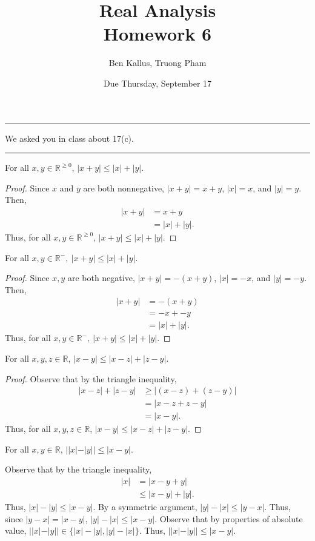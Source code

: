 \documentclass[12pt]{article}
\title{Real Analysis \\ Homework 6}
\author{Ben Kallus, Truong Pham}
\date{Due Thursday, September 17}
\begin{document}
\maketitle

\hrule
\bigskip

 We asked you in class about 17(c). 

\bigskip
\hrule
\bigskip


 For all $x,y \in \mathbb R^{\geq0}$, $|x+y|\leq|x|+|y|$.
\begin{proof}
    Since $x$ and $y$ are both nonnegative, $|x+y| = x+y$, $|x| = x$, and $|y| = y$. Then,
    \begin{align*}
        |x+y| &= x + y \\
              &= |x| + |y|.
    \end{align*}
    Thus, for all $x, y \in \mathbb R^{\geq0}$, $|x+y| \leq |x| + |y|$.
\end{proof}

 For all $x,y \in \mathbb R^-,~|x+y|\leq|x|+|y|$.
\begin{proof}
    Since $x, y$ are both negative, $|x+y| = -(x + y)$, $|x| = -x$, and $|y| = -y$. Then,
    \begin{align*}
        |x+y| &= -(x + y) \\
              &= -x + -y \\
              &= |x| + |y|.
    \end{align*}
    Thus, for all $x,y \in \mathbb R^-,~|x+y|\leq|x|+|y|$.
\end{proof}

\newpage
{} For all $x,y,z \in \mathbb R$, $|x-y| \leq |x - z| + |z - y|$.
\begin{proof}
Observe that by the triangle inequality, \begin{align*}
    |x - z| + |z - y| &\geq |(x-z) + (z-y)| \\
                      &=    |x - z + z - y| \\
                      &=    |x - y|.
\end{align*}
Thus, for all $x,y,z \in \mathbb R$, $|x-y| \leq |x - z| + |z - y|$.
\end{proof}
    
\newpage
{} For all $x,y \in \mathbb R$, $||x|-|y|| \leq |x-y|$.

    Observe that by the triangle inequality, \begin{align*}
        |x| &= |x - y + y| \\
            &\leq |x - y| + |y|.
    \end{align*}
    Thus, $|x| - |y| \leq |x - y|$. By a symmetric argument, $|y| - |x| \leq |y - x|$. Thus, since $|y - x| = |x - y|$, $|y| - |x| \leq |x - y|$. Observe that by properties of absolute value, $||x| - |y|| \in \{|x| - |y|, |y| - |x|\}$. Thus, $||x| - |y|| \leq |x - y|$.
\end{document}
